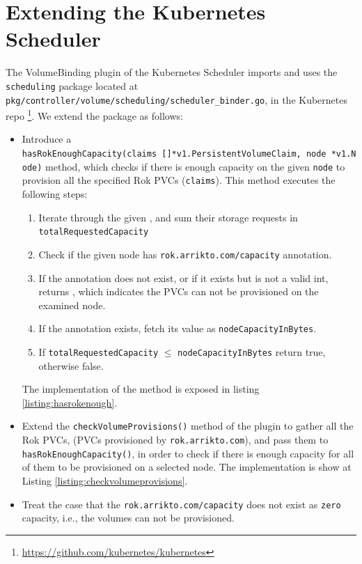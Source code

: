 

\section{Extending the Kubernetes Scheduler}

The VolumeBinding plugin of the Kubernetes Scheduler imports and uses the
\texttt{scheduling} package located at
\texttt{pkg/controller/volume/scheduling/scheduler\_binder.go}, in the
Kubernetes repo \footnote{\url{https://github.com/kubernetes/kubernetes}}. We
extend the package as follows:

\begin{itemize}
      \tightlist
      \item Introduce a \texttt{hasRokEnoughCapacity(claims\
            {[}{]}*v1.PersistentVolumeClaim,\ node\ *v1.Node)} method, which
            checks if there is enough capacity on the given \texttt{node} to
            provision all the specified Rok PVCs (\texttt{claims}). This method
            executes the following steps:
            \begin{enumerate}
                  \tightlist
                  \item Iterate through the given , and sum their
                        storage requests in
                        \texttt{totalRequestedCapacity}
                  \item Check if the given node has
                        \texttt{rok.arrikto.com/capacity} annotation.
                  \item If the annotation does not exist, or if it exists but is
                        not a valid int, returns \co{false}, which indicates the
                        PVCs can not be provisioned on the examined node.
                  \item If the annotation exists, fetch its value as
                        \texttt{nodeCapacityInBytes}.
                  \item If \texttt{totalRequestedCapacity} $\leq$
                        \texttt{nodeCapacityInBytes} return true, otherwise
                        false.
            \end{enumerate}
            The implementation of the method is exposed in listing
            \ref{listing:hasrokenough}.
      \item Extend the \texttt{checkVolumeProvisions()} method of the
            \co{VolumeBinding} plugin to gather all the Rok PVCs, (PVCs
            provisioned by \texttt{rok.arrikto.com}), and pass them to
            \texttt{hasRokEnoughCapacity()}, in order to check if there is
            enough capacity for all of them to be provisioned on a selected
            node. The implementation is show at Listing
            \ref{listing:checkvolumeprovisions}.
      \item Treat the case that the \texttt{rok.arrikto.com/capacity} does not
            exist as \texttt{zero} capacity, i.e., the volumes can not be
            provisioned.
\end{itemize}

